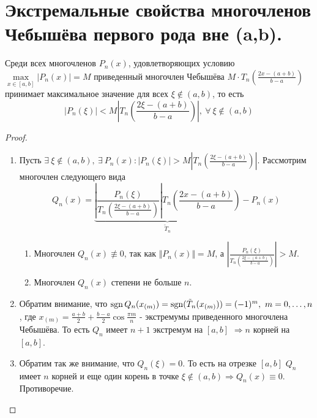 \section{Экстремальные свойства многочленов Чебышёва
  первого рода вне (a,b).}

\begin{theorem}
  Среди всех многочленов $P_n(x)$, удовлетворяющих условию $\max\limits_{x\in[a,b]}|P_n(x)|=M$
  приведенный многочлен Чебышёва $M\cdot T_n\left(\frac{2x-(a+b)}{b-a}\right)$ принимает максимальное значение
  для всех $\xi\notin(a,b)$, то есть
  \[|P_n(\xi)|<M\left|T_n\left(\frac{2\xi-(a+b)}{b-a}\right)\right|,\ \forall\ \xi\notin(a,b)\]
\end{theorem}
\begin{proof}
  \begin{enumerate}
    \item Пусть $\exists\ \xi\notin(a,b),\ \exists\ P_n(x): |P_n(\xi)|>M\left|T_n\left(\frac{2\xi-(a+b)}{b-a}\right)\right|$. Рассмотрим многочлен следующего вида
          \[Q_n(x)=\underbrace{\left|\frac{P_n(\xi)}{T_n\left(\frac{2\xi-(a+b)}{b-a}\right)}\right|T_n\left(\frac{2x-(a+b)}{b-a}\right)}_{\tilde{T}_n} - P_n(x)\]
          \begin{enumerate}
            \item Многочлен $Q_n(x)\not\equiv0$, так как $\Vert P_n(x)\Vert=M$, а $\left|\frac{P_n(\xi)}{T_n\left(\frac{2\xi-(a+b)}{b-a}\right)}\right|>M$.
            \item Многочлен $Q_n(x)$ степени не больше $n$.
          \end{enumerate}
    \item Обратим внимание, что $\operatorname{sgn} Q_n(x_{(m)})=\operatorname{sgn}(\tilde{T}_n(x_{(m)}))=(-1)^m,\ m=0,\ldots,n$, где $x_{(m)}=\frac{a+b}{2}+\frac{b-a}{2}\cos\frac{\pi m}{n}$
          - экстремумы приведенного многочлена Чебышёва. То есть $Q_n$ имеет $n+1$ экстремум на $[a,b]$ $\Rightarrow n$ корней на $[a,b]$.
    \item Обратим так же внимание, что $Q_n(\xi)=0$. То есть на отрезке $[a,b]$
          $Q_n$ имеет $n$ корней и еще один корень в точке $\xi\notin(a,b)\Rightarrow Q_n(x)\equiv0$. Противоречие.
  \end{enumerate}
\end{proof}

